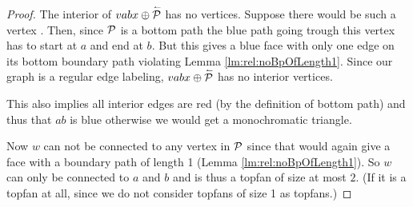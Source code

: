 \begin{proof}
      The interior of  $vabx \oplus \rev \P$ has no vertices. Suppose there would be such a vertex . Then, since $\P$ is a bottom path the blue path going trough this vertex has to start at $a$ and end at $b$. But this gives a blue face with only one edge on its bottom boundary path violating Lemma \ref{lm:rel:noBpOfLength1}. Since our graph is a regular edge labeling, $vabx \oplus \rev \P$ has no interior vertices.

      This also implies all interior edges are red (by the definition of bottom path) and thus that $ab$ is blue otherwise we would get a monochromatic triangle.

      Now $w$ can not be connected to any vertex in $\P$ since that would again give a face with a boundary path of length 1 (Lemma \ref{lm:rel:noBpOfLength1}).
      So $w$ can only be connected to $a$ and $b$ and is thus a topfan of size at most $2$.
      (If it is a topfan at all, since we do not consider topfans of size 1 as topfans.)
    \end{proof}

